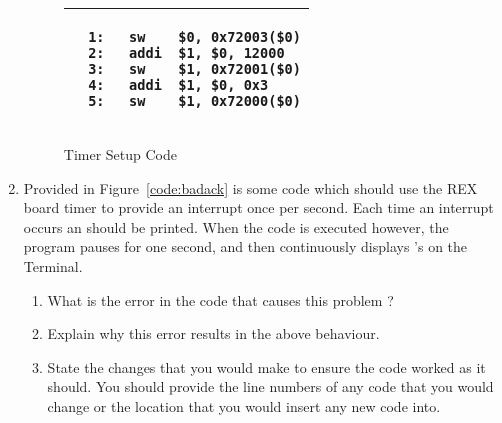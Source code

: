 \documentclass[a4paper,10pt]{article}
\begin{document}
\begin{enumerate}
\begin{figure}[h]
\begin{small}
\begin{center}
\begin{tabular}{|p{6cm}|}
\hline
\begin{verbatim}
  1:   sw    $0, 0x72003($0)
  2:   addi  $1, $0, 12000
  3:   sw    $1, 0x72001($0)
  4:   addi  $1, $0, 0x3
  5:   sw    $1, 0x72000($0)
\end{verbatim}
\\ \hline
\end{tabular}
\end{center}
\end{small}
\caption{Timer Setup Code}
\label{code:timer}
\end{figure}

\item Provided in Figure~\ref{code:badack} is some code which should
use the REX board timer to provide an interrupt once per second. Each
time an interrupt occurs an  should be printed. When the code is
executed however, the program pauses for one second, and then
continuously displays 's on the Terminal.

\label{ques:badack}

\begin{enumerate}
\item What is the error in the code that causes this problem ?

\item Explain why this error results in the above behaviour.

\item State the changes that you would make to ensure the code worked
as it should. You should provide the line numbers of any code that you
would change or the location that you would insert any new code into.

\end{enumerate}


\end{enumerate}
\end{document}
